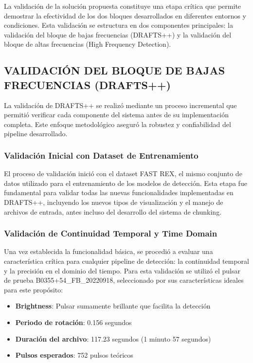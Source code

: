 
La validación de la solución propuesta constituye una etapa crítica que permite demostrar la efectividad de los dos bloques desarrollados en diferentes entornos y condiciones. Esta validación se estructura en dos componentes principales: la validación del bloque de bajas frecuencias (DRAFTS++) y la validación del bloque de altas frecuencias (High Frequency Detection).

\subsection{VALIDACIÓN DEL BLOQUE DE BAJAS FRECUENCIAS (DRAFTS++)}

La validación de DRAFTS++ se realizó mediante un proceso incremental que permitió verificar cada componente del sistema antes de su implementación completa. Este enfoque metodológico aseguró la robustez y confiabilidad del pipeline desarrollado.

\subsubsection{Validación Inicial con Dataset de Entrenamiento}

El proceso de validación inició con el dataset FAST REX, el mismo conjunto de datos utilizado para el entrenamiento de los modelos de detección. Esta etapa fue fundamental para validar todas las nuevas funcionalidades implementadas en DRAFTS++, incluyendo los nuevos tipos de visualización y el manejo de archivos de entrada, antes incluso del desarrollo del sistema de chunking.

\subsubsection{Validación de Continuidad Temporal y Time Domain}

Una vez establecida la funcionalidad básica, se procedió a evaluar una característica crítica para cualquier pipeline de detección: la continuidad temporal y la precisión en el dominio del tiempo. Para esta validación se utilizó el pulsar de prueba B0355+54\_FB\_20220918, seleccionado por sus características ideales para este propósito:

\begin{itemize}
    \item \textbf{Brightness}: Pulsar sumamente brillante que facilita la detección
    \item \textbf{Periodo de rotación}: 0.156 segundos
    \item \textbf{Duración del archivo}: 117.23 segundos (1 minuto 57 segundos)
    \item \textbf{Pulsos esperados}: 752 pulsos teóricos
\end{itemize}

